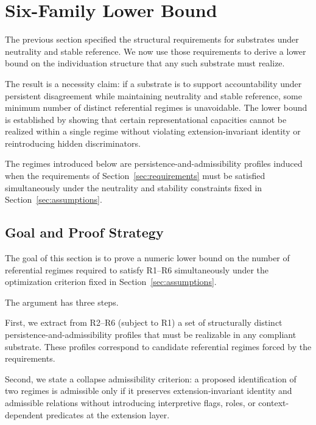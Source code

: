 
\section{Six-Family Lower Bound}
\label{sec:six}

The previous section specified the structural requirements
for substrates under neutrality and stable reference.
We now use those requirements to derive a lower bound on the
individuation structure that any such substrate must realize.

The result is a necessity claim:
if a substrate is to support accountability under persistent disagreement
while maintaining neutrality and stable reference,
some minimum number of distinct referential regimes is unavoidable.
The lower bound is established by showing that certain representational
capacities cannot be realized within a single regime
without violating extension-invariant identity
or reintroducing hidden discriminators.

The regimes introduced below are persistence-and-admissibility profiles
induced when the requirements of Section~\ref{sec:requirements}
must be satisfied simultaneously under the neutrality and stability
constraints fixed in Section~\ref{sec:assumptions}.

\subsection{Goal and Proof Strategy}
\label{sec:goal_proof_strategy}

The goal of this section is to prove a numeric lower bound
on the number of referential regimes required
to satisfy R1--R6 simultaneously under the optimization criterion
fixed in Section~\ref{sec:assumptions}.

The argument has three steps.

First, we extract from R2--R6 (subject to R1) a set of
structurally distinct persistence-and-admissibility profiles
that must be realizable in any compliant substrate.
These profiles correspond to candidate referential regimes
forced by the requirements.

Second, we state a collapse admissibility criterion:
a proposed identification of two regimes is admissible only if
it preserves extension-invariant identity and admissible relations
without introducing interpretive flags, roles, or context-dependent
predicates at the extension layer.

